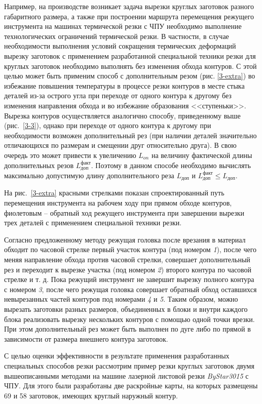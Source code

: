 \documentclass[11pt,twoside,openany]{report}
\begin{document}
Например, на производстве возникает задача
вырезки круглых заготовок разного габаритного размера,
а также при построении маршрута перемещения режущего инструмента
на машинах термической резки с ЧПУ необходимо выполнение
технологических ограничений термической резки.
В частности, в случае необходимости выполнения условий
сокращения термических деформаций вырезку заготовок с
применением разработанной специальной техники резки
для круглых заготовок необходимо выполнять без изменения обхода контуров.
С этой целью может быть применим способ с дополнительным резом
(рис. \ref{3-extra})
во избежание повышения температуры в процессе резки контуров
в месте стыка деталей из-за острого угла
при переходе от одного контура к другому без изменения
направления обхода и во избежание образования <<ступеньки>>.
Вырезка контуров осуществляется аналогично способу,
приведенному выше
(рис.~\ref{3-3}),
однако при переходе от одного контура к другому
при необходимости возможен дополнительный рез
(при наличии деталей значительно отличающихся по размерам и смещении друг относительно друга).
В свою очередь это может привести к увеличению
$L_{on}$
на величину фактической длины дополнительных резов
$L_\text{доп}^\text{факт}$.
Поэтому в данном способе необходимо вычислять максимально допустимую длину дополнительного реза
$L_\text{доп}$
и
$L_\text{доп}^\text{факт} \leqslant L_\text{доп}$.

На рис.~\ref{3-extra}
красными стрелками показан спроектированный путь
перемещения инструмента на рабочем ходу при прямом обходе контуров,
фиолетовым – обратный ход режущего инструмента
при завершении вырезки трех деталей с
применением специальной техники резки.

Согласно предложенному методу режущая головка
после врезания в материал обходит по часовой
стрелке первый участок контура
(под номером {\it 1}),
после чего меняя направление обхода против
часовой стрелки,
совершает дополнительный рез и
переходит к вырезке участка
(под номером {\it 2})
второго контура по часовой стрелке и т. д.
Пока режущий инструмент не завершит
вырезку полного контура с номером {\it 3},
после чего режущая головка совершает обратный обход
оставшихся невырезанных частей контуров под номерами
{\it 4} и {\it 5}.
Таким образом, можно вырезать заготовки разных размеров,
объединенных в блоки и внутри каждого блока реализовать
вырезку нескольких контуров с помощью одной точки врезки.
При этом дополнительный рез может быть выполнен по дуге
либо по прямой в зависимости от размера внешнего контура заготовок.

С целью оценки эффективности в результате применения
разработанных специальных способов резки рассмотрим
пример резки круглых заготовок двумя вышеописанными
методами на машине лазерной листовой резки
{\it ByStar3015} с ЧПУ.
Для этого были разработаны две раскройные карты,
на которых размещены 69 и 58 заготовок,
имеющих круглый наружный контур.
\end{document}
